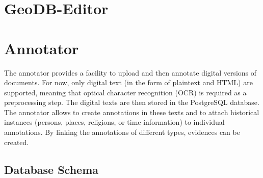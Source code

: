 \section{GeoDB-Editor}


\section{Annotator}
\label{sec:annotator}

The annotator provides a facility to upload and then annotate digital versions of documents.
For now, only digital text (in the form of plaintext and HTML) are supported, meaning that optical character recognition (OCR) is required as a preprocessing step.
The digital texts are then stored in the PostgreSQL database.
The annotator allows to create annotations in these texts and to attach historical instances (persons, places, religions, or time information) to individual annotations.
By linking the annotations of different types, evidences can be created.


\subsection{Database Schema}
\label{sec:database-schema}

